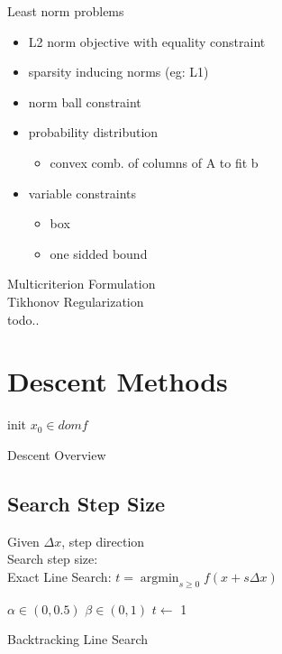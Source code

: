 \documentclass[8pt]{report}
\DeclareMathOperator*{\argmin}{argmin}
\begin{document}
\begin{multicols*}{2}
  Least norm problems
  \begin{itemize}
  \item L2 norm objective with equality constraint
  \item sparsity inducing norms (eg: L1)
  \item norm ball constraint
  \item probability distribution
    \begin{itemize}
    \item convex comb. of columns of A to fit b
    \end{itemize}
  \item variable constraints
    \begin{itemize}
    \item box
    \item one sidded bound
    \end{itemize}
  \end{itemize}

  Multicriterion Formulation\\

  Tikhonov Regularization\\
  todo..
  
  \vfill\null
  
  \pagebreak

  \section{Descent Methods}

  \begin{algorithm}[H]
    init $x_0 \in dom f$\;
    \caption{Descent Overview\label{Descent}}
  \end{algorithm}
  
  \subsection{Search Step Size}
  Given $\Delta x$, step direction\\
  Search step size:\\
  Exact Line Search: $t = \argmin_{s\geq 0} f(x+s \Delta x)$\\

  \begin{algorithm}[H]
    $\alpha \in (0,0.5)$\;
    $\beta \in (0,1)$\;
    $t \leftarrow$ 1\;
    \caption{Backtracking Line Search\label{LS_BT}}
  \end{algorithm}


\end{multicols*}
\end{document}
